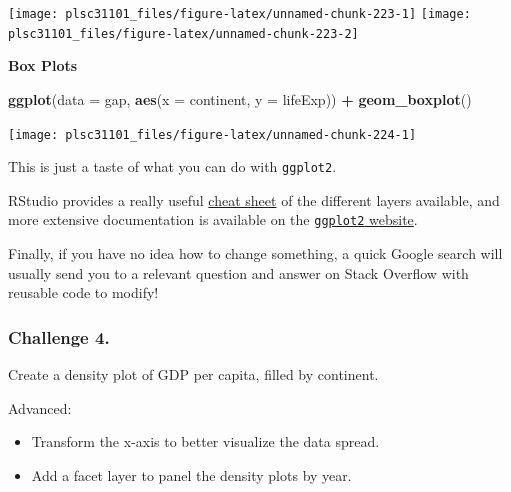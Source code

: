 \documentclass[
]{book}
\newenvironment{Shaded}{\begin{snugshade}}{\end{snugshade}}
\newcommand{\DataTypeTok}[1]{\textcolor[rgb]{0.13,0.29,0.53}{#1}}
\newcommand{\KeywordTok}[1]{\textcolor[rgb]{0.13,0.29,0.53}{\textbf{#1}}}
\newcommand{\NormalTok}[1]{#1}
\newcommand{\OperatorTok}[1]{\textcolor[rgb]{0.81,0.36,0.00}{\textbf{#1}}}
\newcommand{\StringTok}[1]{\textcolor[rgb]{0.31,0.60,0.02}{#1}}
\providecommand{\tightlist}{%
  \setlength{\itemsep}{0pt}\setlength{\parskip}{0pt}}
\begin{document}
\begin{center}\texttt{[image: plsc31101\_files/figure-latex/unnamed-chunk-223-1]} \texttt{[image: plsc31101\_files/figure-latex/unnamed-chunk-223-2]} \end{center}

\textbf{Box Plots}

\begin{Shaded}
\begin{Highlighting}[]
\KeywordTok{ggplot}\NormalTok{(}\DataTypeTok{data =}\NormalTok{ gap, }\KeywordTok{aes}\NormalTok{(}\DataTypeTok{x =}\NormalTok{ continent, }\DataTypeTok{y =}\NormalTok{ lifeExp)) }\OperatorTok{+}\StringTok{ }
\StringTok{  }\KeywordTok{geom_boxplot}\NormalTok{()}
\end{Highlighting}
\end{Shaded}

\begin{center}\texttt{[image: plsc31101\_files/figure-latex/unnamed-chunk-224-1]} \end{center}

This is just a taste of what you can do with \texttt{ggplot2}.

RStudio provides a really useful \href{https://www.rstudio.com/wp-content/uploads/2015/03/ggplot2-cheatsheet.pdf}{cheat sheet} of the different layers available, and more extensive documentation is available on the \href{http://docs.ggplot2.org/current/}{\texttt{ggplot2} website}.

Finally, if you have no idea how to change something, a quick Google search will usually send you to a relevant question and answer on Stack Overflow with reusable code to modify!

\hypertarget{challenge-4.-1}{%
\subsubsection*{Challenge 4.}\label{challenge-4.-1}}

Create a density plot of GDP per capita, filled by continent.

Advanced:

\begin{itemize}
\tightlist
\item
  Transform the x-axis to better visualize the data spread.
\item
  Add a facet layer to panel the density plots by year.
\end{itemize}
\end{document}
